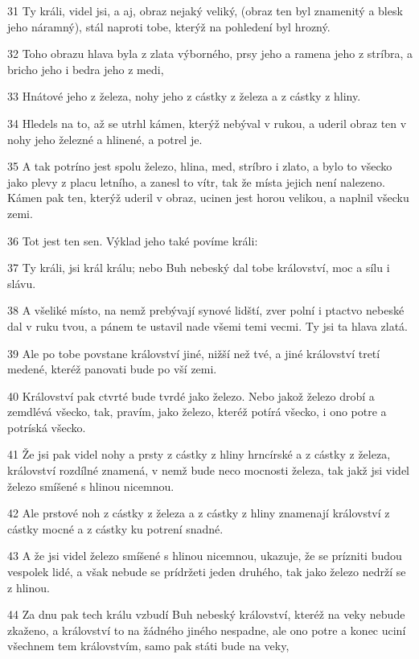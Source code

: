 \par 31 Ty králi, videl jsi, a aj, obraz nejaký veliký, (obraz ten byl znamenitý a blesk jeho náramný), stál naproti tobe, kterýž na pohledení byl hrozný.
\par 32 Toho obrazu hlava byla z zlata výborného, prsy jeho a ramena jeho z stríbra, a bricho jeho i bedra jeho z medi,
\par 33 Hnátové jeho z železa, nohy jeho z cástky z železa a z cástky z hliny.
\par 34 Hledels na to, až se utrhl kámen, kterýž nebýval v rukou, a uderil obraz ten v nohy jeho železné a hlinené, a potrel je.
\par 35 A tak potríno jest spolu železo, hlina, med, stríbro i zlato, a bylo to všecko jako plevy z placu letního, a zanesl to vítr, tak že místa jejich není nalezeno. Kámen pak ten, kterýž uderil v obraz, ucinen jest horou velikou, a naplnil všecku zemi.
\par 36 Tot jest ten sen. Výklad jeho také povíme králi:
\par 37 Ty králi, jsi král králu; nebo Buh nebeský dal tobe království, moc a sílu i slávu.
\par 38 A všeliké místo, na nemž prebývají synové lidští, zver polní i ptactvo nebeské dal v ruku tvou, a pánem te ustavil nade všemi temi vecmi. Ty jsi ta hlava zlatá.
\par 39 Ale po tobe povstane království jiné, nižší než tvé, a jiné království tretí medené, kteréž panovati bude po vší zemi.
\par 40 Království pak ctvrté bude tvrdé jako železo. Nebo jakož železo drobí a zemdlévá všecko, tak, pravím, jako železo, kteréž potírá všecko, i ono potre a potríská všecko.
\par 41 Že jsi pak videl nohy a prsty z cástky z hliny hrncírské a z cástky z železa, království rozdílné znamená, v nemž bude neco mocnosti železa, tak jakž jsi videl železo smíšené s hlinou nicemnou.
\par 42 Ale prstové noh z cástky z železa a z cástky z hliny znamenají království z cástky mocné a z cástky ku potrení snadné.
\par 43 A že jsi videl železo smíšené s hlinou nicemnou, ukazuje, že se prízniti budou vespolek lidé, a však nebude se prídržeti jeden druhého, tak jako železo nedrží se z hlinou.
\par 44 Za dnu pak tech králu vzbudí Buh nebeský království, kteréž na veky nebude zkaženo, a království to na žádného jiného nespadne, ale ono potre a konec uciní všechnem tem královstvím, samo pak státi bude na veky,
